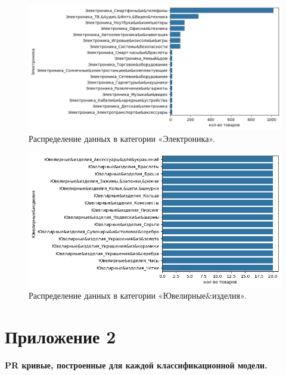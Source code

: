 \documentclass[a4paper,12pt]{extarticle}
\begin{document}
\begin{figure}[hbtp]
	\centering
	\includegraphics[scale=0.8]{приложения/amount_of_category_Электроника.png}
	\caption{Распределение данных в категории «Электроника».}
	\label{fig:amount_of_category_Электроника}
\end{figure}

\begin{figure}[hbtp]
	\centering
	\includegraphics[scale=0.8]{приложения/amount_of_category_Ювелирные&изделия.png}
	\caption{Распределение данных в категории «Ювелирные\&изделия».}
	\label{fig:amount_of_category_Ювелирные&изделия}
\end{figure}

\newpage
\section{Приложение 2}
\label{appendix:pr_curves}
\textbf{\large{PR кривые, построенные для каждой классификационной модели.}}
\end{document}
